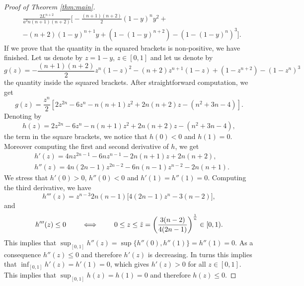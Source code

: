 \documentclass[oneside,a4paper,11pt,notitlepage]{article}
\theoremstyle{definition}
\theoremstyle{plain}
\theoremstyle{definition}
\begin{document}
\begin{proof}[Proof of Theorem \ref{thm:main}]
\begin{equation}
\begin{split}
    &\frac{2L^{n+2}}{a^3n(n+1)(n+2)}\bigg[-\frac{(n+1)(n+2)}{2}(1-y)^ny^2+\\
    &-(n+2)(1-y)^{n+1}y
    +(1-(1-y)^{n+2})-(1-(1-y)^n)^3\bigg].    
\end{split}
\end{equation}
If we prove that the quantity in the squared brackets is non-positive, we have finished. Let us denote by $z=1-y$, $z\in[0,1]$ and let us denote by 
\begin{equation*}
    g(z) = -\frac{(n+1)(n+2)}{2}z^n(1-z)^2-(n+2)z^{n+1}(1-z)
    +(1-z^{n+2})-(1-z^n)^3
\end{equation*}
the quantity inside the squared brackets. After straightforward computation, we get
\begin{equation*}
    g(z) = \frac{z^n}{2}[2z^{2n}-6z^n-n(n+1)z^2+2n(n+2)z-(n^2+3n-4)].
\end{equation*}
Denoting by
\begin{equation*}
    h(z) = 2z^{2n}-6z^n-n(n+1)z^2+2n(n+2)z-(n^2+3n-4),
\end{equation*}
the term in the square brackets, we notice that $h(0)<0$ and $h(1)=0$. Moreover computing the first and second derivative of $h$, we get
\begin{align*}
    &h'(z) = 4nz^{2n-1}-6nz^{n-1}-2n(n+1)z+2n(n+2),\\
    &h''(z) = 4n(2n-1)z^{2n-2}-6n(n-1)z^{n-2}-2n(n+1). 
\end{align*}
We stress that $h'(0)>0$, $h''(0)<0$ and $h'(1)=h''(1)=0$.  Computing the third derivative, we have
\begin{equation*}
h'''(z) = z^{n-3}2n(n-1)\bigg[4(2n-1)z^n-3(n-2)\bigg],
\end{equation*}
and
\begin{equation*}
    h'''(z)\le 0 \qquad \iff\qquad 0\le z\le \Tilde{z}= \bigg(\frac{3(n-2)}{4(2n-1)}\bigg)^{\frac1n}\in [0,1).
\end{equation*}
This implies that $\sup_{[0,1]}h''(z)= \sup\{h''(0),h''(1)\}=h''(1)=0$. As a consequence $h''(z)\le 0$ and therefore $h'(z)$ is decreasing. In turns this implies that $\inf_{[0,1]}h'(z)=h'(1)=0$, which gives $h'(z)>0 $ for all $z\in [0,1]$. This implies that $\sup_{[0,1]}h(z)= h(1)=0$ and therefore $h(z)\le 0$.




\end{proof}
\end{document}

